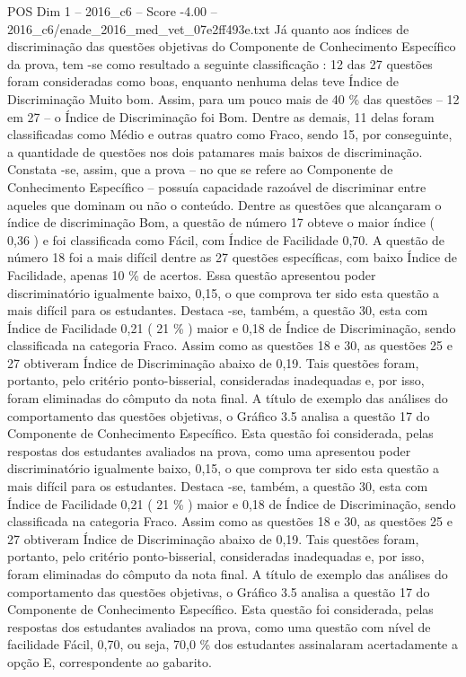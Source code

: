\begin{textsample}{POS Dim 1 – 2016\_c6 – Score -4.00 – 2016\_c6/enade\_2016\_med\_vet\_07e2ff493e.txt}
Já quanto aos índices de discriminação das questões objetivas do Componente de Conhecimento Específico da prova, tem -se como resultado a seguinte classificação : 12 das 27 questões foram consideradas como boas, enquanto nenhuma delas teve Índice de Discriminação Muito bom.
Assim, para um pouco mais de 40 \% das questões – 12 em 27 – o Índice de Discriminação foi Bom.
Dentre as demais, 11 delas foram classificadas como Médio e outras quatro como Fraco, sendo 15, por conseguinte, a quantidade de questões nos dois patamares mais baixos de discriminação.
Constata -se, assim, que a prova – no que se refere ao Componente de Conhecimento Específico – possuía capacidade razoável de discriminar entre aqueles que dominam ou não o conteúdo.
Dentre as questões que alcançaram o índice de discriminação Bom, a questão de número 17 obteve o maior índice ( 0,36 ) e foi classificada como Fácil, com Índice de Facilidade 0,70.
A questão de número 18 foi a mais difícil dentre as 27 questões específicas, com baixo Índice de Facilidade, apenas 10 \% de acertos.
Essa questão apresentou poder discriminatório igualmente baixo, 0,15, o que comprova ter sido esta questão a mais difícil para os estudantes.
Destaca -se, também, a questão 30, esta com Índice de Facilidade 0,21 ( 21 \% ) maior e 0,18 de Índice de Discriminação, sendo classificada na categoria Fraco.
Assim como as questões 18 e 30, as questões 25 e 27 obtiveram Índice de Discriminação abaixo de 0,19.
Tais questões foram, portanto, pelo critério ponto-bisserial, consideradas inadequadas e, por isso, foram eliminadas do cômputo da nota final.
A título de exemplo das análises do comportamento das questões objetivas, o Gráfico 3.5 analisa a questão 17 do Componente de Conhecimento Específico.
Esta questão foi considerada, pelas respostas dos estudantes avaliados na prova, como uma apresentou poder discriminatório igualmente baixo, 0,15, o que comprova ter sido esta questão a mais difícil para os estudantes.
Destaca -se, também, a questão 30, esta com Índice de Facilidade 0,21 ( 21 \% ) maior e 0,18 de Índice de Discriminação, sendo classificada na categoria Fraco.
Assim como as questões 18 e 30, as questões 25 e 27 obtiveram Índice de Discriminação abaixo de 0,19.
Tais questões foram, portanto, pelo critério ponto-bisserial, consideradas inadequadas e, por isso, foram eliminadas do cômputo da nota final.
A título de exemplo das análises do comportamento das questões objetivas, o Gráfico 3.5 analisa a questão 17 do Componente de Conhecimento Específico.
Esta questão foi considerada, pelas respostas dos estudantes avaliados na prova, como uma questão com nível de facilidade Fácil, 0,70, ou seja, 70,0 \% dos estudantes assinalaram acertadamente a opção E, correspondente ao gabarito.

\end{textsample}
